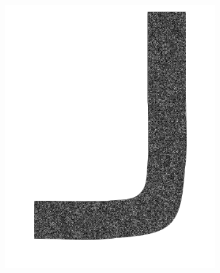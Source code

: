 \begin{figure}[H]
\begin{subfigure}{0.31\linewidth}
		\includegraphics[width=\linewidth]{figs/pipe/pipe_mesh.png}
		\caption{}
		\label{fig:referenceSolutionsPipeMesh}
	\end{subfigure}\\
	\begin{subfigure}{0.31\linewidth}
		\centering

\end{subfigure}
\end{figure}
